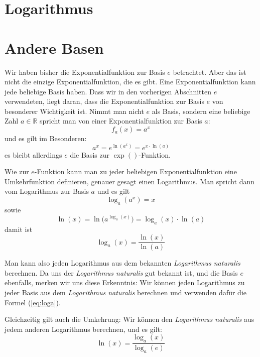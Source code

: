 \section{Logarithmus}



\section{Andere Basen}

Wir haben bisher die Exponentialfunktion zur Basis $e$ betrachtet. Aber das ist nicht die einzige Exponentialfunktion, die es gibt. Eine Exponentialfunktion kann jede beliebige Basis haben. Dass wir in den vorherigen Abschnitten $e$ verwendeten, liegt daran, dass die Exponentialfunktion zur Basis $e$ von besonderer Wichtigkeit ist. Nimmt man nicht $e$ als Basis, sondern eine beliebige Zahl $a\in \mathbb{R}$ spricht man von einer Exponentialfunktion zur Basis $a$:
\begin{equation}
f_a(x) = a^x
\end{equation}
und es gilt im Besonderen:
\begin{equation}\label{eq:ax}
a^x = e^{\ln(a^x)} = e^{x\cdot \ln(a)}
\end{equation}
es bleibt allerdings $e$ die Basis zur $\exp()$-Funktion.

Wie zur $e$-Funktion kann man zu jeder beliebigen Exponentialfunktion eine Umkehrfunktion definieren, genauer gesagt einen Logarithmus. Man spricht dann vom Logarithmus zur Basis $a$ und es gilt
\begin{equation}
\log_a (a^x) = x
\end{equation}
sowie
\begin{equation*}
\ln(x) = \ln\big( a^{\log_a(x)}\big) = \log_a(x) \cdot \ln(a)
\end{equation*}
damit ist
\begin{equation}\label{eq:loga}
\log_a(x) = \frac{\ln(x)}{\ln(a)}
\end{equation}

Man kann also jeden Logarithmus aus dem bekannten \emph{Logarithmus naturalis} berechnen. Da uns der \emph{Logarithmus naturalis} gut bekannt ist, und die Basis $e$ ebenfalls, merken wir uns diese Erkenntnis: Wir können jeden Logarithmus zu jeder Basis aus dem \emph{Logarithmus naturalis} berechnen und verwenden dafür die Formel (\ref{eq:loga}).

Gleichzeitig gilt auch die Umkehrung: Wir können den \emph{Logarithmus naturalis} aus jedem anderen Logarithmus berechnen, und es gilt:
\begin{equation}
\ln(x) = \frac{\log_a(x)}{\log_a(e)}
\end{equation}

